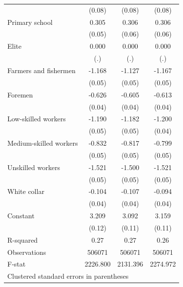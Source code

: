 {\begin{tabular}{l*{3}{c}}
                    &      (0.08)         &      (0.08)         &      (0.08)         \\
Primary school      &       0.305\sym{***}&       0.306\sym{***}&       0.306\sym{***}\\
                    &      (0.05)         &      (0.06)         &      (0.06)         \\
Elite               &       0.000         &       0.000         &       0.000         \\
                    &         (.)         &         (.)         &         (.)         \\
Farmers and fishermen&      -1.168\sym{***}&      -1.127\sym{***}&      -1.167\sym{***}\\
                    &      (0.05)         &      (0.05)         &      (0.05)         \\
Foremen             &      -0.626\sym{***}&      -0.605\sym{***}&      -0.613\sym{***}\\
                    &      (0.04)         &      (0.04)         &      (0.04)         \\
Low-skilled workers &      -1.190\sym{***}&      -1.182\sym{***}&      -1.200\sym{***}\\
                    &      (0.05)         &      (0.05)         &      (0.04)         \\
Medium-skilled workers&      -0.832\sym{***}&      -0.817\sym{***}&      -0.799\sym{***}\\
                    &      (0.05)         &      (0.05)         &      (0.05)         \\
Unskilled workers   &      -1.521\sym{***}&      -1.500\sym{***}&      -1.521\sym{***}\\
                    &      (0.05)         &      (0.05)         &      (0.05)         \\
White collar        &      -0.104\sym{**} &      -0.107\sym{**} &      -0.094\sym{*}  \\
                    &      (0.04)         &      (0.04)         &      (0.04)         \\
Constant            &       3.209\sym{***}&       3.092\sym{***}&       3.159\sym{***}\\
                    &      (0.12)         &      (0.11)         &      (0.11)         \\
\hline
R-squared           &        0.27         &        0.27         &        0.26         \\
Observations        &      506071         &      506071         &      506071         \\
F-stat              &    2226.800         &    2131.396         &    2274.972         \\
\hline\hline
\multicolumn{4}{l}{\footnotesize Clustered standard errors in parentheses}\\
\end{tabular}
}
